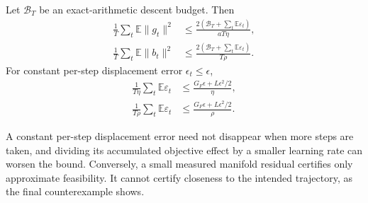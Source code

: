 \begin{corollary}
Let $\mathcal B_T$ be an exact-arithmetic descent budget. Then
\begin{align}
 \frac1T\sum_t\mathbb E\|g_t\|^2
 &\le\frac{2(\mathcal B_T+\sum_t\mathbb E\varepsilon_t)}{aT\eta},\\
 \frac1T\sum_t\mathbb E\|b_t\|^2
 &\le\frac{2(\mathcal B_T+\sum_t\mathbb E\varepsilon_t)}{T\rho}.
\end{align}
For constant per-step displacement error $\epsilon_t\le\epsilon$,
\begin{align}
 \frac1{T\eta}\sum_t\mathbb E\varepsilon_t
 &\le\frac{G_F\epsilon+L\epsilon^2/2}{\eta},\\
 \frac1{T\rho}\sum_t\mathbb E\varepsilon_t
 &\le\frac{G_F\epsilon+L\epsilon^2/2}{\rho}.
\end{align}
\end{corollary}

A constant per-step displacement error need not disappear when more steps are taken, and dividing its accumulated objective effect by a smaller learning rate can worsen the bound. Conversely, a small measured manifold residual certifies only approximate feasibility. It cannot certify closeness to the intended trajectory, as the final counterexample shows.

